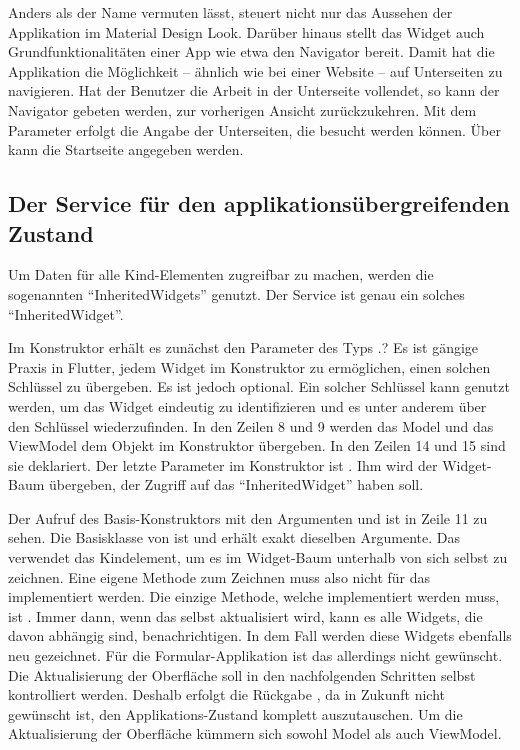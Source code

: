 Anders als der Name vermuten lässt, steuert  nicht nur das Aussehen der Applikation im Material Design Look.
Darüber hinaus stellt das Widget auch Grundfunktionalitäten einer App wie etwa den Navigator bereit.
Damit hat die Applikation die Möglichkeit – ähnlich wie bei einer Website – auf Unterseiten zu navigieren.
Hat der Benutzer die Arbeit in der Unterseite vollendet, so kann der Navigator gebeten werden, zur vorherigen Ansicht zurückzukehren.
 Mit dem Parameter   erfolgt die Angabe der Unterseiten, die besucht werden können.
Über   kann die Startseite angegeben werden.



\subsection{Der Service für den applikationsübergreifenden Zustand}

Um Daten für alle Kind-Elementen zugreifbar zu machen, werden die sogenannten \enquote{InheritedWidgets} genutzt.
Der Service  \Lst{\ref{lst:Schritt1DerServiceAppState}} ist genau ein solches \enquote{InheritedWidget}.

Im Konstruktor erhält es zunächst den Parameter des Typs  .?
Es ist gängige Praxis in Flutter, jedem Widget im Konstruktor zu ermöglichen, einen solchen Schlüssel zu übergeben.
Es ist jedoch optional.
 Ein solcher Schlüssel kann genutzt werden, um das Widget eindeutig zu identifizieren und es unter anderem über den Schlüssel wiederzufinden.
In den Zeilen 8 und 9 werden das Model und das ViewModel dem Objekt  im Konstruktor übergeben.
In den Zeilen 14 und 15 sind sie deklariert.
Der letzte Parameter im Konstruktor ist .
Ihm wird der Widget-Baum übergeben, der Zugriff auf das \enquote{InheritedWidget} haben soll.

Der Aufruf des Basis-Konstruktors mit den Argumenten  und  ist in Zeile 11 zu sehen.
Die Basisklasse von  ist  und erhält exakt dieselben Argumente.
 Das  verwendet das Kindelement, um es im Widget-Baum unterhalb von sich selbst zu zeichnen.
 Eine eigene Methode zum Zeichnen muss also nicht für das  implementiert werden.
Die einzige Methode, welche implementiert werden muss, ist  .
Immer dann, wenn das  selbst aktualisiert wird, kann es alle Widgets, die davon abhängig sind, benachrichtigen.
 In dem Fall werden diese  Widgets ebenfalls neu gezeichnet.
Für die Formular-Applikation ist das allerdings nicht gewünscht.
Die Aktualisierung der Oberfläche soll in den nachfolgenden Schritten selbst kontrolliert werden.
Deshalb erfolgt die Rückgabe , da in Zukunft nicht gewünscht ist, den Applikations-Zustand komplett auszutauschen.
 Um die  Aktualisierung  der Oberfläche  kümmern sich sowohl Model als auch ViewModel.

